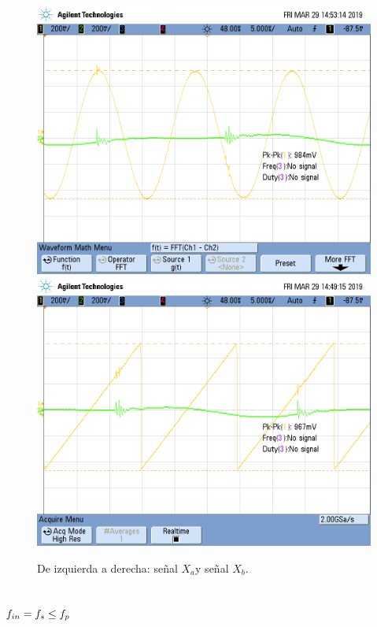 \documentclass[../../ASSD_TP1_G7.tex]{subfiles}
\begin{document}
\begin{figure}[H]

\begin{centering}
\includegraphics[scale=0.25]{Imagenes/llave_senooo_pto_bf1}\includegraphics[scale=0.25]{Imagenes/llave_djente_pto_bfa}\caption{De izquierda a derecha: señal $X_{a}$y señal $X_{b}$.}
\par\end{centering}
\end{figure}


\subsection{$f_{in}=f_{s}\protect\leq f_{p}$}
\end{document}
